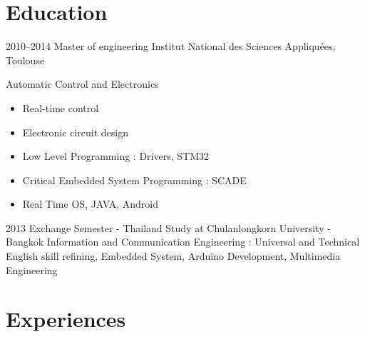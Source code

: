 \documentclass[a4paper]{friggeri-cv} %
\begin{document}
\section{Education}

\begin{entrylist}

\entry
{2010--2014}
{Master of engineering}
{Institut National des Sciences Appliquées, Toulouse}
{ Automatic Control and Electronics
\begin{itemize}
\item Real-time control 
\item Electronic circuit design
\item Low Level Programming : Drivers, STM32
\item Critical Embedded System Programming : SCADE
\item Real Time OS, JAVA, Android
\end{itemize}}


\entry
{2013}
{Exchange Semester - Thailand}
{Study at Chulanlongkorn University - Bangkok}
{Information and Communication Engineering : 
Universal and Technical English skill refining, Embedded System, Arduino Development, Multimedia Engineering}





\end{entrylist}





\section{Experiences}
\end{document}

